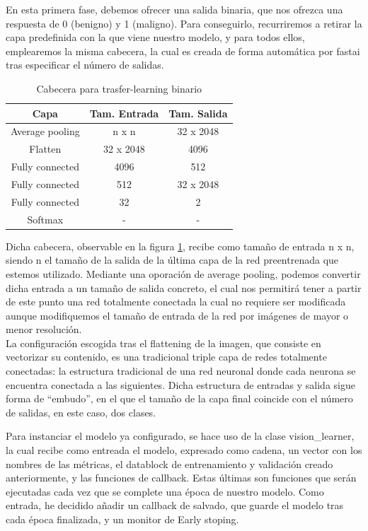 En esta primera fase, debemos ofrecer una salida binaria, que nos ofrezca una respuesta de 0 (benigno) y 1 (maligno). Para conseguirlo, recurriremos a retirar la capa predefinida con la que viene nuestro modelo, y para todos ellos, emplearemos la misma cabecera, la cual es creada de forma automática por fastai tras especificar el número de salidas.

\begin{table}[H]
	\centering
	\caption{Cabecera para trasfer-learning binario}
	\begin{tabular}{|c|c|c|}
		\hline
		\textbf{Capa} & \textbf{Tam. Entrada} & \textbf{Tam. Salida} \\ \hline
		Average pooling & n x n & 32 x 2048 \\ \hline
		Flatten & 32 x 2048 & 4096 \\ \hline
		Fully connected & 4096 & 512 \\ \hline
		Fully connected & 512 & 32 x 2048 \\ \hline
		Fully connected & 32 & 2 \\ \hline
		Softmax & - & - \\ \hline
	\end{tabular}
	\label{header}
\end{table}

Dicha cabecera, observable en la figura \ref{header}, recibe como tamaño de entrada n x n, siendo n el tamaño de la salida de la última capa de la red preentrenada que estemos utilizado. Mediante una oporación de average pooling, podemos convertir dicha entrada a un tamaño de salida concreto, el cual nos permitirá tener a partir de este punto una red totalmente conectada la cual no requiere ser modificada aunque modifiquemos el tamaño de entrada de la red por imágenes de mayor o menor resolución. \\

La configuración escogida tras el flattening de la imagen, que consiste en vectorizar su contenido, es una tradicional triple capa de redes totalmente conectadas: la estructura tradicional de una red neuronal donde cada neurona se encuentra conectada a las siguientes. Dicha estructura de entradas y salida sigue forma de ``embudo'', en el que el tamaño de la capa final coincide con el  número de salidas, en este caso, dos clases.

Para instanciar el modelo ya configurado, se hace uso de la clase vision\_learner, la cual recibe como entreada el modelo, expresado como cadena, un vector con los nombres de las métricas, el datablock de entrenamiento y validación creado anteriormente, y las funciones de callback. Estas últimas son funciones que serán ejecutadas cada vez que se complete una época de nuestro modelo. Como entrada, he decidido añadir un callback de salvado, que guarde el modelo tras cada época finalizada, y un monitor de Early stoping.



